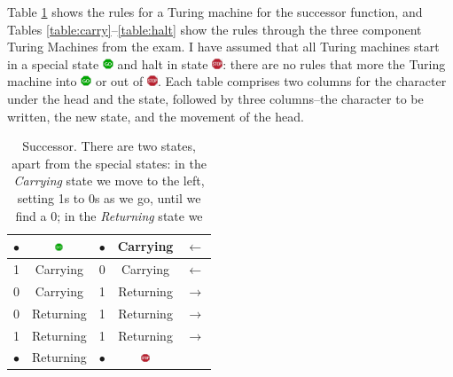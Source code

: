 \documentclass[]{article}
\begin{document}
Table \ref{table:successor} shows the rules for a Turing machine for the successor function, and Tables  \ref{table:carry}--\ref{table:halt} show the rules through the three component Turing Machines from the exam. I have assumed that all Turing machines start in a special state \includegraphics[width=9pt]{gosign} and halt in state \includegraphics[width=9pt]{stop}: there are no rules that more the Turing machine into \includegraphics[width=9pt]{gosign} or out of \includegraphics[width=9pt]{stop}. Each table comprises two columns for the character under the head and the state, followed by three columns--the character to be written, the new state, and the movement of the head.
\begin{table}[H]
	\begin{center}
		\caption{Successor. There are two states, apart from the special states: in the \emph{Carrying} state we move to the left, setting 1s to 0s as we go, until we find a 0; in the \emph{Returning} state we }\label{table:successor}
		\begin{tabular}{|c|c||c|c|c|} \hline
			$\bullet$ &\includegraphics[width=9pt,height=7pt]{gosign}&$\bullet$ &Carrying&$\leftarrow$ \\ \hline
			1&Carrying&0&Carrying&$\leftarrow$ \\ \hline
			0&Carrying&1&Returning&$\rightarrow$ \\ \hline
			0&Returning&1&Returning&$\rightarrow$ \\ \hline
			1&Returning&1&Returning&$\rightarrow$ \\ \hline
			$\bullet$ &Returning&	$\bullet$&\includegraphics[width=9pt,height=7pt]{stop}& \\ \hline
		\end{tabular}
	\end{center}
\end{table}
\end{document}
